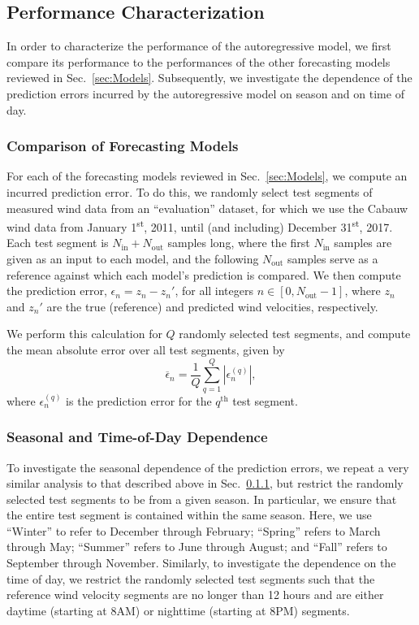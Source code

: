 \documentclass[11pt, oneside]{article}
\newcommand{\secref}[1]{Sec.~\ref{#1}}
\begin{document}
\subsection{Performance Characterization}
In order to characterize the performance of the autoregressive model, we first compare its performance to the performances of the other forecasting models reviewed in \secref{sec:Models}.
Subsequently, we investigate the dependence of the prediction errors incurred by the autoregressive model on season and on time of day.

\subsubsection{Comparison of Forecasting Models}\label{sec:Methodology:Comparison}
For each of the forecasting models reviewed in \secref{sec:Models}, we compute an incurred prediction error.
To do this, we randomly select test segments of measured wind data from an ``evaluation'' dataset, for which we use the Cabauw wind data from January 1\textsuperscript{st}, 2011, until (and including) December 31\textsuperscript{st}, 2017.
Each test segment is $N_\text{in} + N_\text{out}$ samples long, where the first $N_\text{in}$ samples are given as an input to each model, and the following $N_\text{out}$ samples serve as a reference against which each model's prediction is compared.
We then compute the prediction error, $\epsilon_n = z_n - z_n'$, for all integers $n \in [0,N_\text{out}-1]$, where $z_n$ and $z_n'$ are the true (reference) and predicted wind velocities, respectively.

We perform this calculation for $Q$ randomly selected test segments, and compute the mean absolute error over all test segments, given by
\begin{equation}\label{eq:MAE}
\overline{\epsilon}_n = \frac{1}{Q} \sum_{q = 1}^Q \left| \epsilon_n^{(q)} \right|,
\end{equation}
where $\epsilon_n^{(q)}$ is the prediction error for the $q^\text{th}$ test segment.

\subsubsection{Seasonal and Time-of-Day Dependence}\label{sec:Methodology:SeasonalAndDiurnalDependence}
To investigate the seasonal dependence of the prediction errors, we repeat a very similar analysis to that described above in \secref{sec:Methodology:Comparison}, but restrict the randomly selected test segments to be from a given season.
In particular, we ensure that the entire test segment is contained within the same season.
Here, we use ``Winter'' to refer to December through February;
``Spring'' refers to March through May;
``Summer'' refers to June through August; and
``Fall'' refers to September through November.
Similarly, to investigate the dependence on the time of day, we restrict the randomly selected test segments such that the reference wind velocity segments are no longer than 12 hours and are either daytime (starting at 8AM) or nighttime (starting at 8PM) segments.
\end{document}

